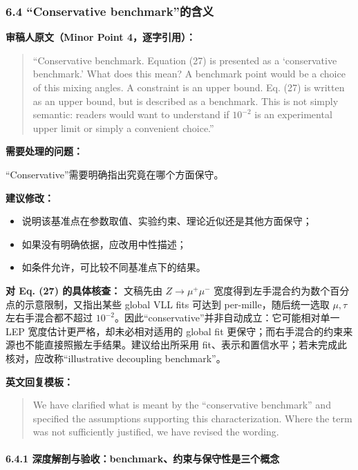 \documentclass[
  chinese,
  UTF8]{ctexart}
\providecommand{\tightlist}{%
  \setlength{\itemsep}{0pt}\setlength{\parskip}{0pt}}
\begin{document}
\subsubsection{6.4 ``Conservative
benchmark''的含义}\label{conservative-benchmarkux7684ux542bux4e49}

\textbf{审稿人原文（Minor Point 4，逐字引用）：}

\begin{quote}
``Conservative benchmark. Equation (27) is presented as a `conservative
benchmark.' What does this mean? A benchmark point would be a choice of
this mixing angles. A constraint is an upper bound. Eq. (27) is written
as an upper bound, but is described as a benchmark. This is not simply
semantic: readers would want to understand if \(10^{-2}\) is an
experimental upper limit or simply a convenient choice.''
\end{quote}

\textbf{需要处理的问题：}

``Conservative''需要明确指出究竟在哪个方面保守。

\textbf{建议修改：}

\begin{itemize}
\tightlist
\item
  说明该基准点在参数取值、实验约束、理论近似还是其他方面保守；
\item
  如果没有明确依据，应改用中性描述；
\item
  如条件允许，可比较不同基准点下的结果。
\end{itemize}

\textbf{对 Eq. (27) 的具体核查：} 文稿先由 \(Z\to\mu^+\mu^-\)
宽度得到左手混合约为数个百分点的示意限制，又指出某些 global VLL fits
可达到 per-mille，随后统一选取 \(\mu,\tau\) 左右手混合都不超过
\(10^{-2}\)。因此``conservative''并非自动成立：它可能相对单一 LEP
宽度估计更严格，却未必相对适用的 global fit
更保守；而右手混合的约束来源也不能直接照搬左手结果。建议给出所采用
fit、表示和置信水平；若未完成此核对，应改称``illustrative decoupling
benchmark''。

\textbf{英文回复模板：}

\begin{quote}
We have clarified what is meant by the ``conservative benchmark'' and
specified the assumptions supporting this characterization. Where the
term was not sufficiently justified, we have revised the wording.
\end{quote}

\paragraph{6.4.1
深度解剖与验收：benchmark、约束与保守性是三个概念}\label{ux6df1ux5ea6ux89e3ux5256ux4e0eux9a8cux6536benchmarkux7ea6ux675fux4e0eux4fddux5b88ux6027ux662fux4e09ux4e2aux6982ux5ff5}
\end{document}
